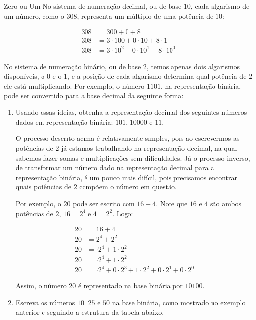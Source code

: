 \clearpage
\begin{task}{Zero ou Um}
No sistema de numeração decimal, ou de base $10$, cada algarismo de um número, como o $308$, representa um múltiplo de uma potência de $10$:

\begin{align*}
308&=300+0+8\\
308&=3\cdot100+0\cdot10+8\cdot1\\
308&=3\cdot10^2+0\cdot10^1+8\cdot10^0
\end{align*}
 
No sistema de numeração binário, ou de base $2$, temos apenas dois algarismos disponíveis, o $0$ e o $1$, e a posição de cada algarismo determina qual potência de $2$ ele está multiplicando. Por exemplo, o número $1101$, na representação binária, pode ser convertido para a base decimal da seguinte forma:

 
\begin{enumerate}
\item Usando essas ideias, obtenha a representação decimal dos seguintes números dados em representação binária: $101$, $10000$ e $11$.

O processo descrito acima é relativamente simples, pois ao escrevermos as potências de $2$ já estamos trabalhando na representação decimal, na qual sabemos fazer somas e multiplicações sem dificuldades. Já o processo inverso, de transformar um número dado na representação decimal para a representação binária, é um pouco mais difícil, pois precisamos encontrar quais potências de $2$ compõem o número em questão.

Por exemplo, o $20$ pode ser escrito com $16+4$. Note que $16$ e $4$ são ambos potências de $2$, $16=2^4$ e $4=2^2$. Logo:
 
\begin{align*}
20&=16+4\\
20&=2^4+2^2\\
20&=\cdot2^4+1\cdot2^2\\
20&=\cdot2^4+1\cdot2^2\\
20&=\cdot2^4+0\cdot2^3+1\cdot2^2+0\cdot2^1+0\cdot2^0
\end{align*}

Assim, o número $20$ é representado na base binária por $10100$.

\item Escreva os números $10$, $25$ e $50$ na base binária, como mostrado no exemplo anterior e seguindo a estrutura da tabela abaixo.

\begin{table}[H]
\centering


\end{table}
\end{enumerate}
\end{task}
